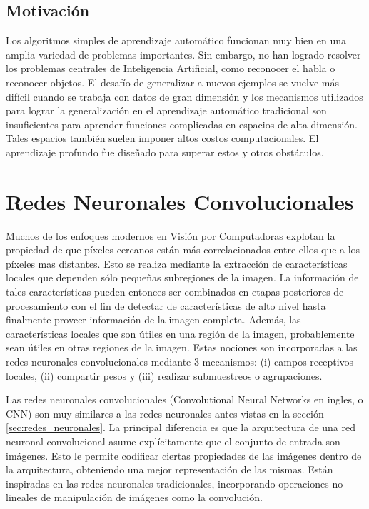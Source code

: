 \documentclass[a4paper,11pt,spanish]{book}
\begin{document}
    \subsection {Motivación}
      Los algoritmos simples de aprendizaje automático funcionan muy bien en una amplia variedad de problemas importantes.
      Sin embargo, no han logrado resolver los problemas centrales de Inteligencia Artificial, como reconocer el habla o reconocer objetos.
      El desafío de generalizar a nuevos ejemplos se vuelve más difícil cuando se trabaja con datos de gran dimensión y los mecanismos utilizados para lograr la generalización
      en el aprendizaje  automático tradicional son insuficientes para aprender funciones complicadas en espacios de alta dimensión.
      Tales espacios también suelen imponer altos costos computacionales. El aprendizaje profundo fue diseñado para superar estos y otros obstáculos.
\fi
  \section {Redes Neuronales Convolucionales} \label{sec:redes_convolucionales}
      Muchos de los enfoques modernos en Visión por Computadoras explotan la propiedad de que píxeles cercanos están más correlacionados entre ellos 
      que a los píxeles mas distantes. 
      Esto se realiza mediante la extracción de características locales que dependen sólo pequeñas subregiones de la imagen. 
      La información de tales características pueden entonces ser combinados en etapas posteriores de procesamiento con el fin de detectar de características de alto nivel 
      hasta finalmente proveer información de la imagen completa. 
      Además, las características locales que son útiles en una región de la imagen, probablemente sean útiles en otras regiones de la imagen.
      Estas nociones son incorporadas a las redes neuronales convolucionales mediante 3 mecanismos: (i) campos receptivos locales, (ii) compartir pesos y 
      (iii) realizar submuestreos o agrupaciones.
  
      Las redes neuronales convolucionales (Convolutional Neural Networks en ingles, o CNN) son muy similares a las redes neuronales antes vistas en la 
      sección \ref{sec:redes_neuronales}.
      La principal diferencia es que la arquitectura de una red neuronal convolucional asume explícitamente que el conjunto de entrada son imágenes. 
      Esto le permite codificar ciertas propiedades de las imágenes dentro de la arquitectura, obteniendo una mejor representación de las mismas.
      Están inspiradas en las redes neuronales tradicionales, incorporando operaciones no-lineales de manipulación de imágenes como la convolución.
      
\end{document}
